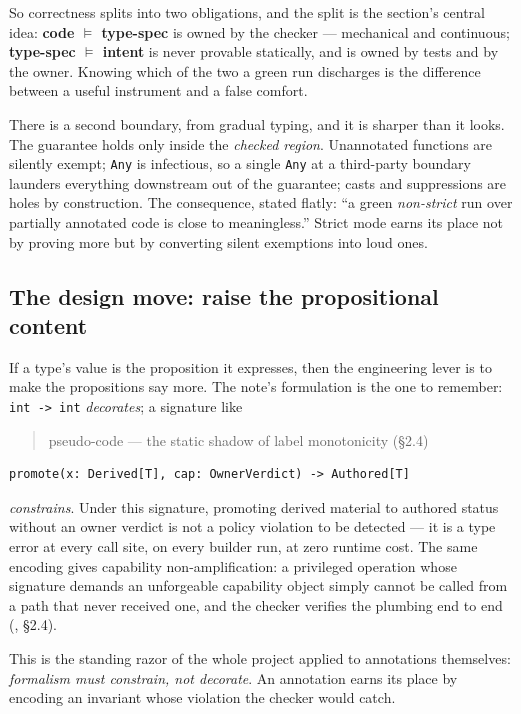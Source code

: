 \noindent So correctness splits into two obligations, and the split is the
section's central idea: \textbf{code $\models$ type-spec} is owned by the checker
--- mechanical and continuous; \textbf{type-spec $\models$ intent} is never
provable statically, and is owned by tests and by the owner. Knowing which of the
two a green run discharges is the difference between a useful instrument and a
false comfort.

There is a second boundary, from gradual typing, and it is sharper than it looks.
The guarantee holds only inside the \emph{checked region}. Unannotated functions
are silently exempt; \texttt{Any} is infectious, so a single \texttt{Any} at a
third-party boundary launders everything downstream out of the guarantee; casts
and suppressions are holes by construction. The consequence, stated flatly: ``a
green \emph{non-strict} run over partially annotated code is close to
meaningless.'' Strict mode earns its place not by proving more but by converting
silent exemptions into loud ones.

\subsection*{The design move: raise the propositional content}

If a type's value is the proposition it expresses, then the engineering lever is to
make the propositions say more. The note's formulation is the one to remember:
\texttt{int -> int} \emph{decorates}; a signature like

\begin{quote}\small\ttfamily
pseudo-code --- the static shadow of label monotonicity (\S 2.4)
\end{quote}
{\small\begin{verbatim}
promote(x: Derived[T], cap: OwnerVerdict) -> Authored[T]
\end{verbatim}}

\noindent \emph{constrains}. Under this signature, promoting derived material to
authored status without an owner verdict is not a policy violation to be detected
--- it is a type error at every call site, on every builder run, at zero runtime
cost. The same encoding gives capability non-amplification: a privileged operation
whose signature demands an unforgeable capability object simply cannot be called
from a path that never received one, and the checker verifies the plumbing end to
end (, \S 2.4).

This is the standing razor of the whole project applied to annotations themselves:
\emph{formalism must constrain, not decorate}. An annotation earns its place by
encoding an invariant whose violation the checker would catch.

